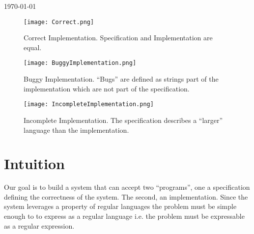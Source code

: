 \documentclass[12pt,journal,compsoc,draftcls]{IEEEtran}
\begin{document}
\hfill \today

\begin{figure*}[!t]
    \begin{center}
        \texttt{[image: Correct.png]}
        \label{fig:correct}
        \caption{Correct Implementation. Specification and Implementation are
        equal.}
    \end{center}
\end{figure*}

\begin{figure*}[!t]
    \centering
        \texttt{[image: BuggyImplementation.png]}
        \label{fig:buggy}
        \caption{Buggy Implementation. ``Bugs'' are defined as strings part of
        the implementation which are not part of the specification.}
\end{figure*}
\begin{figure*}[!t]
    \begin{center}
        \texttt{[image: IncompleteImplementation.png]}
        \label{fig:incomplete}
        \caption{Incomplete Implementation. The specification describes
        a ``larger'' language than the implementation.}
    \end{center}
\end{figure*}

\section{Intuition}
Our goal is to build a system that can accept two ``programs'', one
a specification defining the correctness of the system. The second, an
implementation. Since the system leverages a property of regular languages the
problem must be simple enough to to express as a regular language i.e. the
problem must be expressable as a regular expression. 
\end{document}
